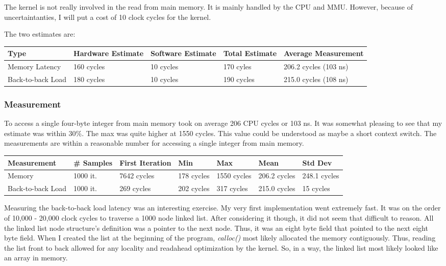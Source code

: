 \documentclass[paper=a4, fontsize=11pt]{scrartcl}
\numberwithin{equation}{section}        %
\numberwithin{figure}{section}          %
\numberwithin{table}{section}               %
\begin{document}
The kernel is not really involved in the read from main memory.  It is mainly handled by the CPU and MMU.  However, because of uncertaintanties, I will put a cost of 10 clock cycles for the kernel.

The two estimates are:

\begin{center}
    \begin{tabular}{ | l | l | l | l | l |}
    \hline
    Type & Hardware Estimate & Software Estimate & Total Estimate & Average Measurement \\      \hline
    Memory Latency & 160 cycles & 10 cycles & 170 cyles & 206.2 cycles (103 ns) \\ 
    Back-to-back Load & 180 cycles & 10 cycles & 190 cycles & 215.0 cycles (108 ns) \\
    \hline
    \end{tabular}
\end{center}


\subsubsection{Measurement}

To access a single four-byte integer from main memory took on average 206 CPU cycles or 103 ns.  It was somewhat pleasing to see that my estimate was within 30\%.  The max was quite higher at 1550 cycles.  This value could be understood as maybe a short context switch.  The measurements are within a reasonable number for accessing a single integer from main memory.


\begin{center}
    \begin{tabular}{ |l | l | l | l | l | l | l |}
    \hline
    Measurement & \# Samples & First Iteration & Min & Max & Mean & Std Dev \\ \hline
    Memory & 1000 it. & 7642 cycles & 178 cycles & 1550 cycles & 206.2 cycles & 248.1  cycles \\ 
    Back-to-back Load & 1000 it. & 269 cycles & 202 cycles & 317 cycles & 215.0 cycles & 15 cycles \\
    \hline
    \end{tabular}
\end{center}

Measuring the back-to-back load latency was an interesting exercise.  My very first implementation went extremely fast.  It was on the order of 10,000 - 20,000 clock cycles to traverse a 1000 node linked list.  After considering it though, it did not seem that difficult to reason.  All the linked list node structure's definition was a pointer to the next node.  Thus, it was an eight byte field that pointed to the next eight byte field.  When I created the list at the beginning of the program, \textit{calloc()} most likely allocated the memory contiguously.  Thus, reading the list front to back allowed for any locality and readahead optimization by the kernel.  So, in a way, the linked list most likely looked like an array in memory.
\end{document}
